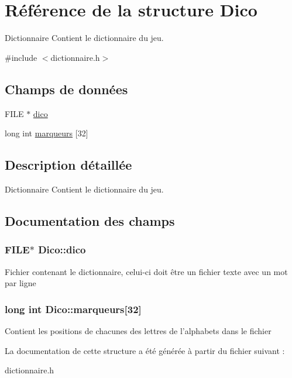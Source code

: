 \hypertarget{structDico}{
\section{Référence de la structure Dico}
\label{structDico}
}


Dictionnaire Contient le dictionnaire du jeu.  




{\ttfamily \#include $<$dictionnaire.h$>$}

\subsection*{Champs de données}
\begin{DoxyCompactItemize}
\item 
FILE $\ast$ \hyperlink{structDico_aa608808df162aebf2b2bfbc4723cfad6}{dico}
\item 
long int \hyperlink{structDico_a1a8a33881f938f4ddd946edc97ae82f8}{marqueurs} \mbox{[}32\mbox{]}
\end{DoxyCompactItemize}


\subsection{Description détaillée}
Dictionnaire Contient le dictionnaire du jeu. 

\subsection{Documentation des champs}
\hypertarget{structDico_aa608808df162aebf2b2bfbc4723cfad6}{
\subsubsection[{dico}]{\setlength{\rightskip}{0pt plus 5cm}FILE$\ast$ {\bf Dico::dico}}}
\label{structDico_aa608808df162aebf2b2bfbc4723cfad6}
Fichier contenant le dictionnaire, celui-\/ci doit être un fichier texte avec un mot par ligne \hypertarget{structDico_a1a8a33881f938f4ddd946edc97ae82f8}{
\subsubsection[{marqueurs}]{\setlength{\rightskip}{0pt plus 5cm}long int {\bf Dico::marqueurs}\mbox{[}32\mbox{]}}}
\label{structDico_a1a8a33881f938f4ddd946edc97ae82f8}
Contient les positions de chacunes des lettres de l'alphabets dans le fichier 

La documentation de cette structure a été générée à partir du fichier suivant :\begin{DoxyCompactItemize}
\item 
dictionnaire.h\end{DoxyCompactItemize}
